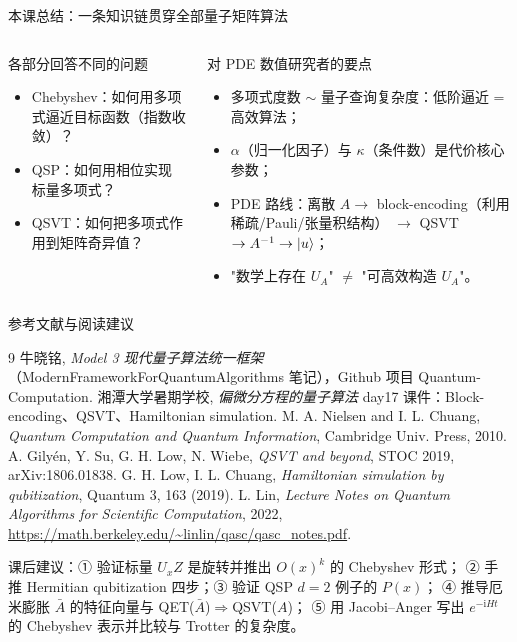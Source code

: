 \documentclass[aspectratio=169,9pt]{ctexbeamer}
\newcommand{\ii}{\mathrm{i}}
\newcommand{\smallcite}[1]{\par\vspace{1.2mm}{\scriptsize\color{graytext}#1}}
\begin{document}
\begin{frame}{本课总结：一条知识链贯穿全部量子矩阵算法}
\begin{columns}[T,totalwidth=\textwidth]
\begin{keybox}{各部分回答不同的问题}
\begin{itemize}
\item Chebyshev：如何用多项式逼近目标函数（指数收敛）？
\item QSP：如何用相位实现标量多项式？
\item QSVT：如何把多项式作用到矩阵奇异值？
\end{itemize}
\end{keybox}
\begin{warnbox}{对 PDE 数值研究者的要点}
\begin{itemize}
\item 多项式度数 $\sim$ 量子查询复杂度：低阶逼近 = 高效算法；
\item $\alpha$（归一化因子）与 $\kappa$（条件数）是代价核心参数；
\item PDE 路线：离散 $A\to$ block-encoding（利用稀疏/Pauli/张量积结构）
$\to$ QSVT $\to A^{-1}\to\ket u$；
\item "数学上存在 $U_A$" $\ne$ "可高效构造 $U_A$"。
\end{itemize}
\end{warnbox}
\end{columns}
\smallcite{Model 3 笔记第 6.4 节知识链与第 7.8 节。}
\end{frame}

\begin{frame}{参考文献与阅读建议}
\scriptsize
\begin{thebibliography}{9}
 牛晓铭, \emph{Model 3 现代量子算法统一框架}（ModernFrameworkForQuantumAlgorithms 笔记），Github 项目 Quantum-Computation.
 湘潭大学暑期学校, \emph{偏微分方程的量子算法} day17 课件：Block-encoding、QSVT、Hamiltonian simulation.
 M. A. Nielsen and I. L. Chuang, \emph{Quantum Computation and Quantum Information}, Cambridge Univ. Press, 2010.
 A. Gily\'en, Y. Su, G. H. Low, N. Wiebe, \emph{QSVT and beyond}, STOC 2019, arXiv:1806.01838.
 G. H. Low, I. L. Chuang, \emph{Hamiltonian simulation by qubitization}, Quantum 3, 163 (2019).
 L. Lin, \emph{Lecture Notes on Quantum Algorithms for Scientific Computation}, 2022, \url{https://math.berkeley.edu/~linlin/qasc/qasc_notes.pdf}.
\end{thebibliography}
\vspace{1mm}
{\tiny\color{graytext}课后建议：① 验证标量 $U_xZ$ 是旋转并推出 $O(x)^k$ 的 Chebyshev 形式；
② 手推 Hermitian qubitization 四步；③ 验证 QSP $d=2$ 例子的 $P(x)$；
④ 推导厄米膨胀 $\bar A$ 的特征向量与 QET($\bar A$)$\Rightarrow$QSVT($A$)；
⑤ 用 Jacobi--Anger 写出 $e^{-\ii Ht}$ 的 Chebyshev 表示并比较与 Trotter 的复杂度。}
\end{frame}
\end{document}
